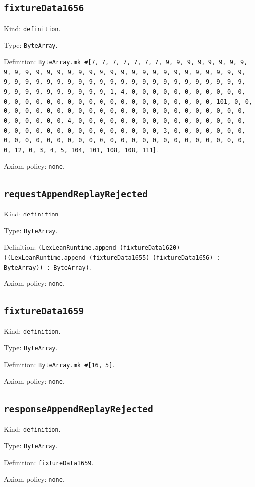 \documentclass[11pt]{article}
\begin{document}
\subsection*{\texttt{fixtureData1656}}
\noindent Kind: \texttt{definition}.\par
\noindent Type: \texttt{ByteArray}.\par
\noindent Definition: \texttt{ByteArray.mk \#[7, 7, 7, 7, 7, 7, 7, 9, 9, 9, 9, 9, 9, 9, 9, 9, 9, 9, 9, 9, 9, 9, 9, 9, 9, 9, 9, 9, 9, 9, 9, 9, 9, 9, 9, 9, 9, 9, 9, 9, 9, 9, 9, 9, 9, 9, 9, 9, 9, 9, 9, 9, 9, 9, 9, 9, 9, 9, 9, 9, 9, 9, 9, 9, 9, 9, 9, 9, 9, 9, 9, 1, 4, 0, 0, 0, 0, 0, 0, 0, 0, 0, 0, 0, 0, 0, 0, 0, 0, 0, 0, 0, 0, 0, 0, 0, 0, 0, 0, 0, 0, 0, 0, 0, 101, 0, 0, 0, 0, 0, 0, 0, 0, 0, 0, 0, 0, 0, 0, 0, 0, 0, 0, 0, 0, 0, 0, 0, 0, 0, 0, 0, 0, 0, 0, 0, 4, 0, 0, 0, 0, 0, 0, 0, 0, 0, 0, 0, 0, 0, 0, 0, 0, 0, 0, 0, 0, 0, 0, 0, 0, 0, 0, 0, 0, 0, 0, 0, 3, 0, 0, 0, 0, 0, 0, 0, 0, 0, 0, 0, 0, 0, 0, 0, 0, 0, 0, 0, 0, 0, 0, 0, 0, 0, 0, 0, 0, 0, 0, 0, 12, 0, 3, 0, 5, 104, 101, 108, 108, 111]}.\par
\noindent Axiom policy: \texttt{none}.\par
\subsection*{\texttt{requestAppendReplayRejected}}
\noindent Kind: \texttt{definition}.\par
\noindent Type: \texttt{ByteArray}.\par
\noindent Definition: \texttt{(LexLeanRuntime.append (fixtureData1620) ((LexLeanRuntime.append (fixtureData1655) (fixtureData1656) : ByteArray)) : ByteArray)}.\par
\noindent Axiom policy: \texttt{none}.\par
\subsection*{\texttt{fixtureData1659}}
\noindent Kind: \texttt{definition}.\par
\noindent Type: \texttt{ByteArray}.\par
\noindent Definition: \texttt{ByteArray.mk \#[16, 5]}.\par
\noindent Axiom policy: \texttt{none}.\par
\subsection*{\texttt{responseAppendReplayRejected}}
\noindent Kind: \texttt{definition}.\par
\noindent Type: \texttt{ByteArray}.\par
\noindent Definition: \texttt{fixtureData1659}.\par
\noindent Axiom policy: \texttt{none}.\par
\end{document}
